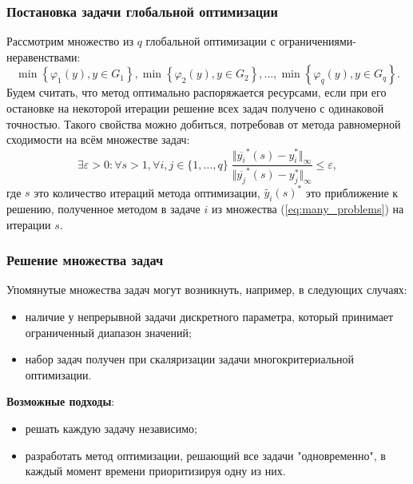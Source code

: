 \documentclass[aspectratio=1610]{beamer}
\begin{document}
\begin{frame}
  \frametitle{Постановка задачи глобальной оптимизации}
  Рассмотрим множество из \(q\) глобальной оптимизации с ограничениями-неравенствами:
  \begin{equation}
    \label{eq:many_problems}
    \min\left\{\varphi_1(y), y\in G_1 \right\}, \min\left\{\varphi_2(y), y\in G_2\right\},...,
  \min\left\{\varphi_q(y), y\in G_q\right\}.
  \end{equation}
  Будем считать, что метод оптимально распоряжается ресурсами, если при его остановке на некоторой итерации
  решение всех задач получено с одинаковой точностью. Такого свойства можно добиться, потребовав
  от метода равномерной сходимости на всём множестве задач:
  \begin{equation}
    \exists \varepsilon > 0: \forall s>1, \forall i,j\in\{1,\dots,q\}\;
      \frac{\Vert \overline{y_i}^*(s) - y_i^*\Vert_\infty}{\Vert \overline{y_j}^*(s) - y_j^*\Vert_	\infty} \leqslant \varepsilon,
  \end{equation}
  где \(s\) это количество итераций метода оптимизации, \(\tilde{y_i}(s)^*\) это приближение к решению, полученное методом в задаче \(i\)
  из множества (\ref{eq:many_problems}) на итерации \(s\).

\end{frame}

\begin{frame}
  \frametitle{Решение множества задач}
  Упомянутые множества задач могут возникнуть, например, в следующих случаях:
  \begin{itemize}
    \item наличие у непрерывной задачи дискретного параметра, который принимает ограниченный диапазон значений;
    \item набор задач получен при скаляризации задачи многокритериальной оптимизации.
  \end{itemize}
\textbf{Возможные подходы}:
  \begin{itemize}
    \item решать каждую задачу независимо;
    \item разработать метод оптимизации, решающий все задачи "одновременно", в каждый момент времени приоритизируя одну из них.
  \end{itemize}
\end{frame}
\end{document}
